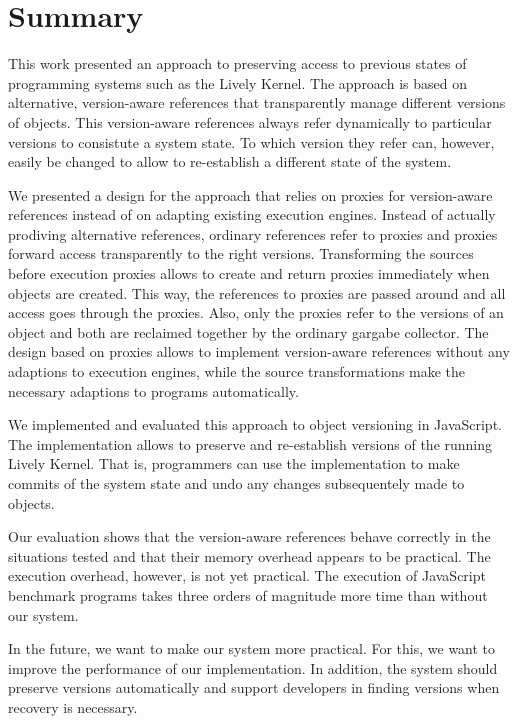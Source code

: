 \chapter{Summary} \label{chapter:SUMMARY}

This work presented an approach to preserving access to previous states of programming systems such as the Lively Kernel.
The approach is based on alternative, version-aware references that transparently manage different versions of objects.
This version-aware references always refer dynamically to particular versions to consistute a system state.
To which version they refer can, however, easily be changed to allow to re-establish a different state of the system.

We presented a design for the approach that relies on proxies for version-aware references instead of on adapting existing execution engines.
Instead of actually prodiving alternative references, ordinary references refer to proxies and proxies forward access transparently to the right versions.
Transforming the sources before execution proxies allows to create and return proxies immediately when objects are created. 
This way, the references to proxies are passed around and all access goes through the proxies.
Also, only the proxies refer to the versions of an object and both are reclaimed together by the ordinary gargabe collector.
The design based on proxies allows to implement version-aware references without any adaptions to execution engines, while the source transformations make the necessary adaptions to programs automatically.

We implemented and evaluated this approach to object versioning in JavaScript.
The implementation allows to preserve and re-establish versions of the running Lively Kernel.
That is, programmers can use the implementation to make commits of the system state and undo any changes subsequentely made to objects.

Our evaluation shows that the version-aware references behave correctly in the situations tested and that their memory overhead appears to be practical. The execution overhead, however, is not yet practical.
The execution of JavaScript benchmark programs takes three orders of magnitude more time than without our system.

In the future, we want to make our system more practical.
For this, we want to improve the performance of our implementation.
In addition, the system should preserve versions automatically and support developers in finding versions when recovery is necessary.

